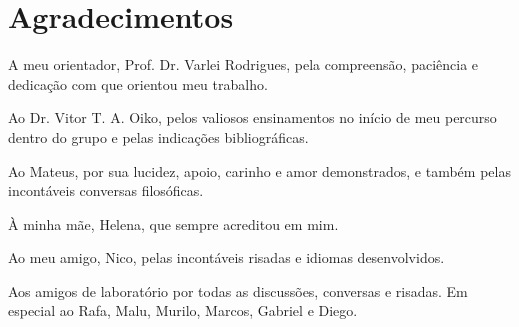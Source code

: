 \newpage

\chapter*{Agradecimentos}

A meu orientador, Prof. Dr. Varlei Rodrigues, pela compreensão, paciência e dedicação com que orientou meu trabalho.

Ao Dr. Vitor T. A. Oiko, pelos valiosos ensinamentos no início de meu percurso dentro do grupo e pelas indicações bibliográficas.

Ao Mateus, por sua lucidez, apoio, carinho e amor  demonstrados, e também pelas incontáveis conversas filosóficas.

À minha mãe, Helena, que sempre acreditou em mim.

Ao meu amigo, Nico, pelas incontáveis risadas e idiomas desenvolvidos.

Aos amigos de laboratório por todas as discussões, conversas e risadas. Em especial ao Rafa, Malu, Murilo, Marcos, Gabriel e Diego.

